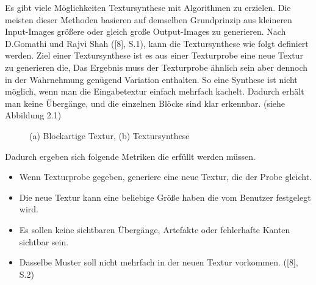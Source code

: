 \documentclass[12pt, a4paper,twoside,openright]{report}
\begin{document}
Es gibt viele Möglichkeiten Textursynthese mit Algorithmen zu erzielen.
Die meisten dieser Methoden basieren auf demselben Grundprinzip aus kleineren Input-Images größere oder gleich große Output-Images zu generieren.
Nach D.Gomathi und Rajvi Shah {([8], S.1)}, kann die Textursynthese wie folgt definiert werden.
\newline
Ziel einer Textursynthese ist es aus einer Texturprobe eine neue Textur zu generieren die, 
Das Ergebnis muss der Texturprobe ähnlich sein aber dennoch in der Wahrnehmung genügend Variation enthalten.
So eine Synthese ist nicht möglich, wenn man die Eingabetextur einfach mehrfach kachelt.
Dadurch erhält man keine  Übergänge, und die einzelnen Blöcke sind klar erkennbar. {(siehe Abbildung 2.1)}

\begin{figure}[H]
    \centering
    \qquad
    \caption{(a) Blockartige Textur, (b) Textursynthese}%
\end{figure}

\noindent Dadurch ergeben sich folgende Metriken die erfüllt werden müssen.

\begin{itemize}
    \item Wenn Texturprobe gegeben, generiere eine neue Textur, die der Probe gleicht.
    \item Die neue Textur kann eine beliebige Größe haben die vom Benutzer festgelegt wird.
    \item Es sollen keine sichtbaren Übergänge, Artefakte oder fehlerhafte Kanten sichtbar sein.
    \item Dasselbe Muster soll nicht mehrfach in der neuen Textur vorkommen. {([8], S.2)}
\end{itemize}
\end{document}
